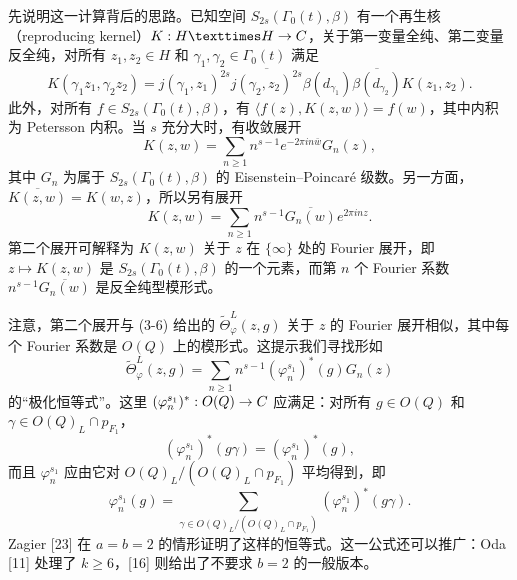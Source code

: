 先说明这一计算背后的思路。已知空间 $S_{2s}(\Gamma_0(t),\beta)$ 有一个再生核（reproducing kernel）$K:H\times H\to\C$，关于第一变量全纯、第二变量反全纯，对所有 $z_1,z_2\in H$ 和 $\gamma_1,\gamma_2\in\Gamma_0(t)$ 满足
\[
 K(\gamma_1z_1,\gamma_2z_2)
 =j(\gamma_1,z_1)^{2s}\overline{j(\gamma_2,z_2)^{2s}}
 \beta(d_{\gamma_1})\overline{\beta(d_{\gamma_2})}K(z_1,z_2).
\]
此外，对所有 $f\in S_{2s}(\Gamma_0(t),\beta)$，有 $\langle f(z),K(z,w)\rangle=f(w)$，其中内积为 Petersson 内积。当 $s$ 充分大时，有收敛展开
\[
 K(z,w)=\sum_{n\ge1}n^{s-1}e^{-2\pi in\bar w}G_n(z),
\]
其中 $G_n$ 为属于 $S_{2s}(\Gamma_0(t),\beta)$ 的 Eisenstein--Poincaré 级数。另一方面，$\overline{K(z,w)}=K(w,z)$，所以另有展开
\[
 K(z,w)=\sum_{n\ge1}n^{s-1}\overline{G_n(w)}e^{2\pi inz}.
\]
第二个展开可解释为 $K(z,w)$ 关于 $z$ 在 $\{\infty\}$ 处的 Fourier 展开，即 $z\mapsto K(z,w)$ 是 $S_{2s}(\Gamma_0(t),\beta)$ 的一个元素，而第 $n$ 个 Fourier 系数 $n^{s-1}\overline{G_n(w)}$ 是反全纯型模形式。

注意，第二个展开与 (3-6) 给出的 $\widetilde\Theta_\varphi^L(z,g)$ 关于 $z$ 的 Fourier 展开相似，其中每个 Fourier 系数是 $O(Q)$ 上的模形式。这提示我们寻找形如
\[
 \widetilde\Theta_\varphi^L(z,g)=\sum_{n\ge1}n^{s-1}(\varphi_n^{s_1})^*(g)G_n(z)
\]
的“极化恒等式”。这里 $(\varphi_n^{s_1})^*:O(Q)\to C$ 应满足：对所有 $g\in O(Q)$ 和 $\gamma\in O(Q)_L\cap p_{F_1}$，
\[
 (\varphi_n^{s_1})^*(g\gamma)=(\varphi_n^{s_1})^*(g),
\]
而且 $\varphi_n^{s_1}$ 应由它对 $O(Q)_L/(O(Q)_L\cap p_{F_1})$ 平均得到，即
\[
 \varphi_n^{s_1}(g)=\sum_{\gamma\in O(Q)_L/(O(Q)_L\cap p_{F_1})}
 (\varphi_n^{s_1})^*(g\gamma).
\]
Zagier [23] 在 $a=b=2$ 的情形证明了这样的恒等式。这一公式还可以推广：Oda [11] 处理了 $k\ge6$，[16] 则给出了不要求 $b=2$ 的一般版本。

